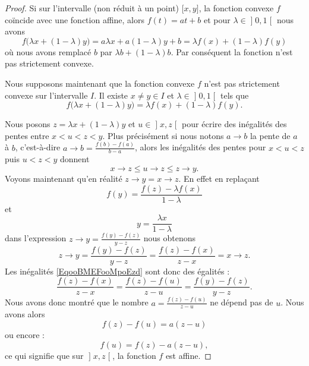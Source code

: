 \begin{proof}
    Si sur l'intervalle (non réduit à un point) \( \mathopen[ x , y \mathclose]\), la fonction convexe \( f\) coïncide avec une fonction affine, alors \( f(t)=at+b\) et pour \( \lambda\in\mathopen] 0 , 1 \mathclose[\) nous avons
    \begin{equation}
            f\big( \lambda x+(1-\lambda)y \big)=a\lambda x+a(1-\lambda)y+b=\lambda f(x)+(1-\lambda)f(y)
    \end{equation}
    où nous avons remplacé \( b\) par \( \lambda b+(1-\lambda)b\). Par conséquent la fonction n'est pas strictement convexe.

    Nous supposons maintenant que la fonction convexe \( f\) n'est pas strictement convexe sur l'intervalle \( I\). Il existe \( x\neq y\in I\) et \( \lambda\in \mathopen] 0 , 1 \mathclose[\) tels que
    \begin{equation}
        f\big( \lambda x+(1-\lambda)y \big)=\lambda f(x)+(1-\lambda)f(y).
    \end{equation}

    Nous posons \( z=\lambda x+(1-\lambda)y\) et \( u\in\mathopen] x , z \mathclose[\) pour écrire des inégalités des pentes entre \( x<u<z<y\). Plus précisément si nous notons \( a\to b\) la pente de \( a\) à \( b\), c'est-à-dire \( a\to b=\frac{ f(b)-f(a) }{ b-a }\), alors les inégalités des pentes pour \( x<u<z\) puis \( u<z<y\) donnent
    \begin{equation}        \label{EqooBMEFooMpoEzd}
        x\to z\leq u\to z\leq z\to y.
    \end{equation}
    Voyons maintenant qu'en réalité \( z\to y=x\to z\). En effet en replaçant
    \begin{equation}
        f(y)=\frac{ f(z)-\lambda f(x) }{ 1-\lambda }
    \end{equation}
    et
    \begin{equation}
        y=\frac{ \lambda x }{ 1-\lambda }
    \end{equation}
    dans l'expression \( z\to y=\frac{ f(y)-f(z) }{ y-z }\) nous obtenons
    \begin{equation}
        z\to y=\frac{ f(y)-f(z) }{ y-z }=\frac{ f(z)-f(x) }{ z-x }=x\to z.
    \end{equation}
    Les inégalités \eqref{EqooBMEFooMpoEzd} sont donc des égalités :
    \begin{equation}
        \frac{ f(z)-f(x) }{ z-x }=\frac{ f(z)-f(u) }{ z-u }=\frac{ f(y)-f(z) }{ y-z }.
    \end{equation}
    Nous avons donc montré que le nombre \( a=\frac{ f(z)-f(u) }{ z-u }\) ne dépend pas de \( u\). Nous avons alors
    \begin{equation}
        f(z)-f(u)=a(z-u)
    \end{equation}
    ou encore :
    \begin{equation}
        f(u)=f(z)-a(z-u),
    \end{equation}
    ce qui signifie que sur \( \mathopen] x , z \mathclose[\), la fonction \( f\) est affine.
\end{proof}

